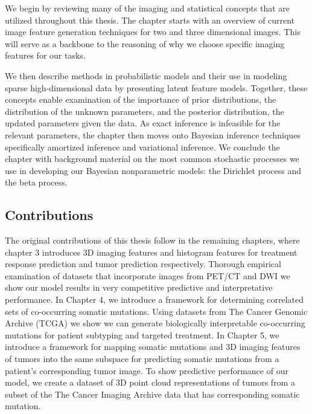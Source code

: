 We begin by reviewing many of the imaging and statistical concepts that are utilized throughout this thesis. The chapter starts with an overview of current image feature generation techniques for two and three dimensional images.  This will serve as a backbone to the reasoning of why we choose specific imaging features for our tasks.

We then describe methods in probabilistic models and their use in modeling sparse high-dimensional data by presenting latent feature models. Together, these concepts enable examination of the importance of prior distributions, the distribution of the unknown parameters, and the posterior distribution, the updated parameters given the data.  As exact inference is infeasible for the relevant parameters, the chapter then moves onto Bayesian inference techniques specifically amortized inference and variational inference. We conclude the chapter with background material on the most common stochastic processes we use in developing our Bayesian nonparametric models: the Dirichlet process and the beta process.


\subsection{Contributions}

The original contributions of this thesis follow in the remaining chapters, where chapter 3 introduces 3D imaging features and histogram features for treatment response prediction and tumor prediction respectively.   Thorough empirical examination of datasets that incorporate images from PET/CT and DWI we show our model results in very competitive predictive and interpretative performance. In Chapter 4, we introduce a framework for determining correlated sets of co-occurring somatic mutations.  Using datasets from The Cancer Genomic Archive (TCGA) we show we can generate biologically interpretable co-occurring mutations for patient subtyping and targeted treatment.  In Chapter 5, we introduce a framework for mapping somatic mutations and 3D imaging features of tumors into the same subspace for predicting somatic mutations from a patient's corresponding tumor image.  To show predictive performance of our model, we create a dataset of 3D point cloud representations of tumors from a subset of the The Cancer Imaging Archive data that has corresponding somatic mutation.  

